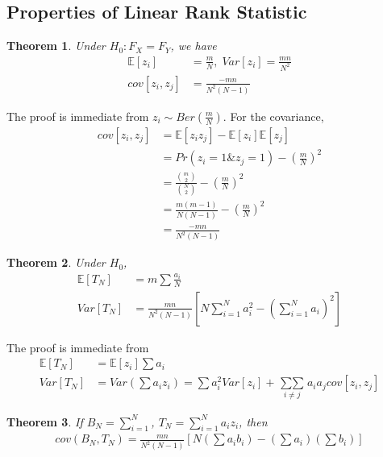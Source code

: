 \documentclass[twoside]{article}
\newtheorem*{theorem*}{Theorem}
\begin{document}
	\subsection{Properties of Linear Rank Statistic}
	\begin{theorem*}
		Under $H_0: F_X=F_Y$, we have
		\begin{align*}
			\mathbb{E} \left[ z_i \right] &= \frac{m}{N}, \; Var \left[ z_i \right] = \frac{mn}{N^2} \\
			cov \left[ z_i, z_j \right] &= \frac{-mn}{N^2 (N-1)}
		\end{align*}
	\end{theorem*}
	The proof is immediate from $z_i \sim Ber \left( \frac{m}{N} \right)$. For the covariance, 
	\begin{align*}
		cov \left[ z_i, z_j \right] &= \mathbb{E} \left[ z_i z_j \right] - \mathbb{E} \left[ z_i \right] \mathbb{E} \left[ z_j \right] \\
		&= Pr \left( z_i = 1 \& z_j = 1 \right) - \left( \frac{m}{N} \right)^2 \\
		&= \frac{\binom{m}{2}}{\binom{N}{2}} - \left( \frac{m}{N} \right)^2 \\
		&= \frac{m(m-1)}{N(N-1)} - \left( \frac{m}{N} \right)^2 \\
		&= \frac{-mn}{N^2 (N-1)}
	\end{align*}
	\begin{theorem*}
		Under $H_0$, 
		\begin{align*}
			\mathbb{E} \left[ T_N \right] &= m \sum \frac{a_i}{N} \\
			Var \left[ T_N \right] &= \frac{mn}{N^2 (N-1)} \left[ N \sum_{i=1}^{N} a_i^2 - \left( \sum_{i=1}^{N} a_i \right)^2 \right]
		\end{align*}
	\end{theorem*}
	The proof is immediate from 
	\begin{align*}
		\mathbb{E} \left[ T_N \right] &= \mathbb{E} \left[ z_i \right] \sum a_i \\
		Var \left[ T_N \right] &= Var \left( \sum a_i z_i \right) = \sum a_i^2 Var \left[ z_i \right] + \mathop{\sum\sum}\limits_{i \neq j} a_i a_j cov \left[ z_i, z_j \right]
	\end{align*}
	\begin{theorem*}
		If $B_N = \sum_{i=1}^{N}$, $T_N = \sum_{i=1}^{N}a_i z_i$, then
		\begin{align*}
			cov\left( B_N, T_N \right) = \frac{mn}{N^2 (N-1)} \left[ N \left(\sum a_i b_i \right) - \left( \sum a_i \right) \left( \sum b_i \right) \right]
		\end{align*}
	\end{theorem*}
\end{document}
